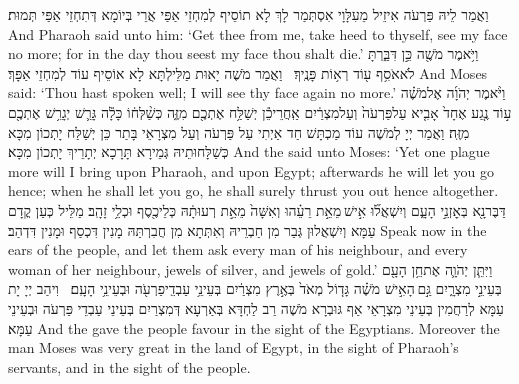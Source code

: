 {וַאֲמַר לֵיהּ פַּרְעֹה אִיזֵיל מֵעִלָּוָי אִסְתְּמַר לָךְ לָא תוֹסֵיף לְמִחְזֵי אַפַּי אֲרֵי בְּיוֹמָא דְּתִחְזֵי אַפַּי תְּמוּת׃}
{And Pharaoh said unto him: ‘Get thee from me, take heed to thyself, see my face no more; for in the day thou seest my face thou shalt die.’}{}
{וַיֹּ֥אמֶר מֹשֶׁ֖ה כֵּ֣ן דִּבַּ֑רְתָּ לֹא\maqqaf אֹסִ֥ף ע֖וֹד רְא֥וֹת פָּנֶֽיךָ׃ \petucha }
{וַאֲמַר מֹשֶׁה יָאוּת מַלֵּילְתָּא לָא אוֹסֵיף עוֹד לְמִחְזֵי אַפָּךְ׃}
{And Moses said: ‘Thou hast spoken well; I will see thy face again no more.’}{}
\newperek
{}
{וַיֹּ֨אמֶר יְהֹוָ֜ה אֶל\maqqaf מֹשֶׁ֗ה ע֣וֹד נֶ֤גַע אֶחָד֙ אָבִ֤יא עַל\maqqaf פַּרְעֹה֙ וְעַל\maqqaf מִצְרַ֔יִם אַֽחֲרֵי\maqqaf כֵ֕ן יְשַׁלַּ֥ח אֶתְכֶ֖ם מִזֶּ֑ה כְּשַׁ֨לְּח֔וֹ כָּלָ֕ה גָּרֵ֛שׁ יְגָרֵ֥שׁ אֶתְכֶ֖ם מִזֶּֽה׃}
{וַאֲמַר יְיָ לְמֹשֶׁה עוֹד מַכְתָּשׁ חַד אַיְתִי עַל פַּרְעֹה וְעַל מִצְרָאֵי בָּתַר כֵּן יְשַׁלַּח יָתְכוֹן מִכָּא כְּשַׁלָּחוּתֵיהּ גְּמֵירָא תָּרָכָא יְתָרֵיךְ יָתְכוֹן מִכָּא׃}
{And the \lord\space said unto Moses: ‘Yet one plague more will I bring upon Pharaoh, and upon Egypt; afterwards he will let you go hence; when he shall let you go, he shall surely thrust you out hence altogether.}{}
{דַּבֶּר\maqqaf נָ֖א בְּאׇזְנֵ֣י הָעָ֑ם וְיִשְׁאֲל֞וּ אִ֣ישׁ \legarmeh  מֵאֵ֣ת רֵעֵ֗הוּ וְאִשָּׁה֙ מֵאֵ֣ת רְעוּתָ֔הּ כְּלֵי\maqqaf כֶ֖סֶף וּכְלֵ֥י זָהָֽב׃}
{מַלֵּיל כְּעַן קֳדָם עַמָּא וְיִשְׁאֲלוּן גְּבַר מִן חַבְרֵיהּ וְאִתְּתָא מִן חֲבִרְתַּהּ מָנִין דִּכְסַף וּמָנִין דִּדְהַב׃}
{Speak now in the ears of the people, and let them ask every man of his neighbour, and every woman of her neighbour, jewels of silver, and jewels of gold.’}{}
{וַיִּתֵּ֧ן יְהֹוָ֛ה אֶת\maqqaf חֵ֥ן הָעָ֖ם בְּעֵינֵ֣י מִצְרָ֑יִם גַּ֣ם \legarmeh  הָאִ֣ישׁ מֹשֶׁ֗ה גָּד֤וֹל מְאֹד֙ בְּאֶ֣רֶץ מִצְרַ֔יִם בְּעֵינֵ֥י עַבְדֵֽי\maqqaf פַרְעֹ֖ה וּבְעֵינֵ֥י הָעָֽם׃ \setuma }
{וִיהַב יְיָ יָת עַמָּא לְרַחֲמִין בְּעֵינֵי מִצְרָאֵי אַף גּוּבְרָא מֹשֶׁה רַב לַחְדָּא בְּאַרְעָא דְּמִצְרַיִם בְּעֵינֵי עַבְדֵי פַּרְעֹה וּבְעֵינֵי עַמָּא׃}
{And the \lord\space gave the people favour in the sight of the Egyptians. Moreover the man Moses was very great in the land of Egypt, in the sight of Pharaoh’s servants, and in the sight of the people.}{}
